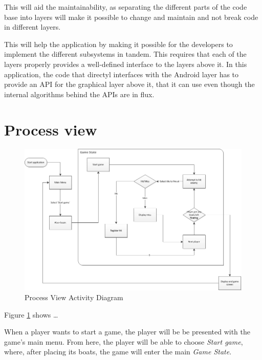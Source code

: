 This will aid the maintainability, as separating the different parts of the code base into layers will make it possible to change and maintain and not break code in different layers.


This will help the application by making it possible for the developers to implement the different subsystems in tandem. This requires that each of the layers properly provides a well-defined interface to the layers above it. In this application, the code that directyl interfaces with the Android layer has to provide an API for the graphical layer above it, that it can use even though the internal algorithms behind the APIs are in flux.


\section{Process view}
    
\begin{figure}[ht]
    \includegraphics[angle=90, scale=0.8]{ProcessLayer.png}
    \caption{Process View Activity Diagram}
    \label{fig:ActivityDiagram}
\end{figure}

Figure \ref{fig:ActivityDiagram} shows …

When a player wants to start a game, the player will be be presented with the game's main menu. From here, the player will be able to choose \emph{Start game}, where, after placing its boats, the game will enter the main \emph{Game State}.

